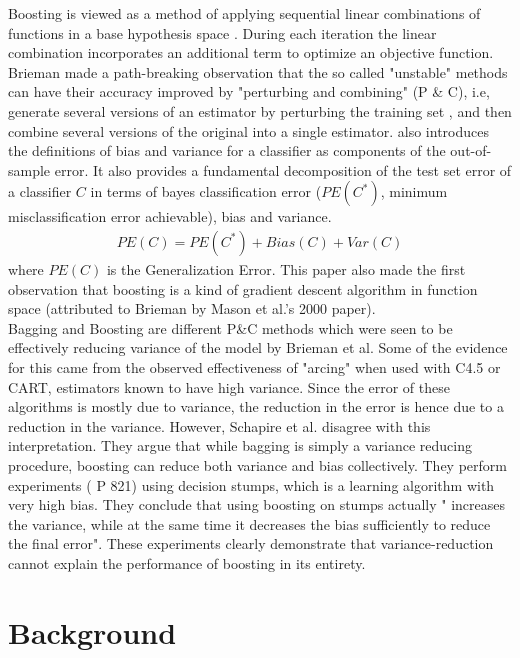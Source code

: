 \documentclass[letterpaper,11pt]{article}
\begin{document}
 Boosting is viewed as a method of applying sequential linear combinations of functions in a base hypothesis space \cite{BL98}. During each iteration the linear combination incorporates an additional term to optimize an objective function. Brieman \cite{BL98} made a path-breaking observation that the so called "unstable" methods can have their accuracy improved by "perturbing and combining" (P \& C), i.e, generate several versions of an estimator by perturbing the training set , and then combine several versions of the original into a single estimator. \cite{BL98} also introduces the definitions of bias and variance for a classifier as components of the out-of-sample error. It also provides a fundamental decomposition of the test set error of a classifier $C$ in terms of bayes classification error ($PE(C^*)$, minimum misclassification error achievable), bias and variance. 
\begin{align}
PE(C) = PE(C^*) + Bias (C) + Var (C) \nonumber
\end{align} 
where $PE(C)$ is the Generalization Error. This paper also made the first observation that boosting is a kind of gradient descent algorithm in function space (attributed to Brieman by Mason et al.'s 2000 paper).\\

Bagging \cite{BL98} and Boosting \cite{sfbl98} are different P\&C methods which were seen to be effectively reducing variance of the model by Brieman et al. Some of the evidence for this came from the observed effectiveness of "arcing" \cite{BL98} when used with C4.5 or CART, estimators known to have high variance. Since the error of these algorithms is mostly due to variance, the reduction in the error is hence due to a reduction in the variance. However, Schapire et al. \cite{sfbl98} disagree with this interpretation. They argue that while bagging is simply a variance reducing procedure, boosting can reduce both variance and bias collectively. They perform experiments (\cite{BL98} P 821) using decision stumps, which is a learning algorithm with very high bias. They conclude that using boosting on stumps actually " increases the variance, while at the same time it decreases the bias sufficiently to reduce the final error". These experiments clearly demonstrate that variance-reduction cannot explain the performance of boosting in its entirety. 

\section {Background}
\end{document}
